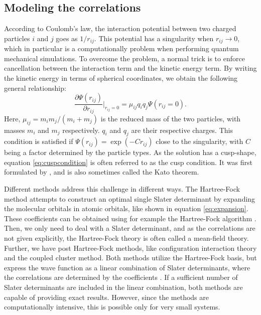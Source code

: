 \subsection{Modeling the correlations} \label{sec:cusp}
According to Coulomb's law, the interaction potential between two charged particles $i$ and $j$ goes as $1/{r_{ij}}$. This potential has a singularity when $r_{ij}\rightarrow 0$, which in particular is a computationally problem when performing quantum mechanical simulations. To overcome the problem, a normal trick is to enforce cancellation between the interaction term and the kinetic energy term. By writing the kinetic energy in terms of spherical coordinates, we obtain the following general relationship\supercite{kato_on_1957}:
\begin{equation}
\frac{\partial\Psi(r_{ij})}{\partial r_{ij}}\bigg|_{r_{ij}=0}=\mu_{ij}q_iq_j\Psi(r_{ij}=0).
\label{eq:cuspcondition}
\end{equation}
Here, $\mu_{ij}=m_im_j/(m_i+m_j)$ is the reduced mass of the two particles, with masses $m_i$ and $m_j$ respectively. $q_i$ and $q_j$ are their respective charges. This condition is satisfied if $\Psi(r_{ij})=\exp(-Cr_{ij})$ close to the singularity, with $C$ being a factor determined by the particle types. As the solution has a cusp-shape, equation \eqref{eq:cuspcondition} is often referred to as the cusp condition. It was first formulated by \citet{kato_on_1957}, and is also sometimes called the Kato theorem. 

Different methods address this challenge in different ways. The Hartree-Fock method attempts to construct an optimal single Slater determinant by expanding the molecular orbitals in atomic orbitals, like shown in equation \eqref{eq:expansion}. These coefficients can be obtained using for example the Hartree-Fock algorithm \supercite{hartree_wave_1928, fock_selfconsistent_1930}. Then, we only need to deal with a Slater determinant, and as the correlations are not given explicitly, the Hartree-Fock theory is often called a mean-field theory. Further, we have post Hartree-Fock methods, like configuration interaction theory and the coupled cluster method. Both methods utilize the Hartree-Fock basis, but express the wave function as a linear combination of Slater determinants, where the correlations are determined by the coefficients \supercite{daniel_crawford_introduction_2007}. If a sufficient number of Slater determinants are included in the linear combination, both methods are capable of providing exact results. However, since the methods are computationally intensive, this is possible only for very small systems.

